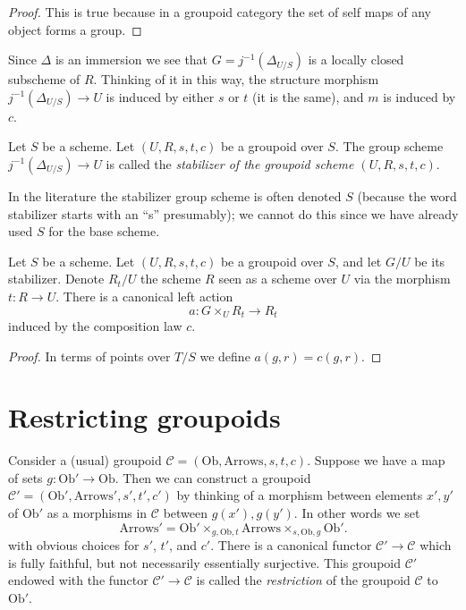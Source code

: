 \begin{proof}
This is true because in a groupoid category the
set of self maps of any object forms a group.
\end{proof}

\noindent
Since $\Delta$ is an immersion we see that $G = j^{-1}(\Delta_{U/S})$
is a locally closed subscheme of $R$. Thinking of it in this way,
the structure morphism $j^{-1}(\Delta_{U/S}) \to U$ is induced by
either $s$ or $t$ (it is the same), and $m$ is induced by $c$.

\begin{definition}
\label{definition-stabilizer-groupoid}
Let $S$ be a scheme.
Let $(U, R, s, t, c)$ be a groupoid over $S$.
The group scheme $j^{-1}(\Delta_{U/S})\to U$
is called the {\it stabilizer of the groupoid scheme
$(U, R, s, t, c)$}.
\end{definition}

\noindent
In the literature the stabilizer group scheme is often denoted $S$
(because the word stabilizer starts with an ``s'' presumably);
we cannot do this since we have already used $S$ for the base scheme.

\begin{lemma}
\label{lemma-groupoid-action-stabilizer}
Let $S$ be a scheme.
Let $(U, R, s, t, c)$ be a groupoid over $S$, and let $G/U$ be its stabilizer.
Denote $R_t/U$ the scheme $R$ seen as a scheme over $U$ via the
morphism $t : R \to U$.
There is a canonical left action
$$
a : G \times_U R_t \longrightarrow R_t
$$
induced by the composition law $c$.
\end{lemma}

\begin{proof}
In terms of points over $T/S$ we define $a(g, r) = c(g, r)$.
\end{proof}








\section{Restricting groupoids}
\label{section-restrict-groupoid}

\noindent
Consider a (usual) groupoid
$\mathcal{C} = (\text{Ob}, \text{Arrows}, s, t, c)$.
Suppose we have a map of sets $g : \text{Ob}' \to \text{Ob}$.
Then we can construct a groupoid
$\mathcal{C}' = (\text{Ob}', \text{Arrows}', s', t', c')$
by thinking of a morphism between elements $x', y'$ of $\text{Ob}'$
as a morphisms in $\mathcal{C}$ between $g(x'), g(y')$.
In other words we set
$$
\text{Arrows}' =
\text{Ob}'
\times_{g, \text{Ob}, t}
\text{Arrows}
\times_{s, \text{Ob}, g}
\text{Ob}'.
$$
with obvious choices for $s'$, $t'$, and $c'$. There is a canonical
functor $\mathcal{C}' \to \mathcal{C}$ which is fully faithful,
but not necessarily essentially surjective. This groupoid $\mathcal{C}'$
endowed with the functor $\mathcal{C}' \to \mathcal{C}$
is called the {\it restriction} of the groupoid
$\mathcal{C}$ to $\text{Ob}'$.

